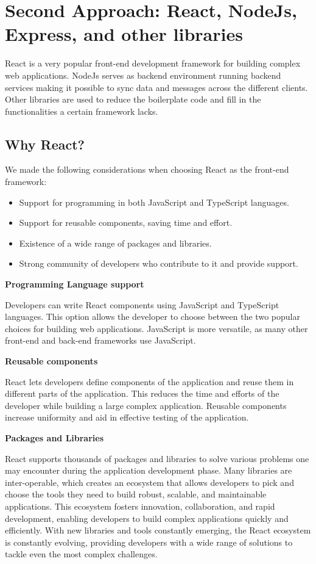 \section{Second Approach: React, NodeJs, Express, and other libraries}
\label{section:second_approach}

React is a very popular front-end development framework for building complex web applications. NodeJs\cite{nodejs} serves as backend environment running backend services making it possible to sync data and messages across the different clients. Other libraries are used to reduce the boilerplate code and fill in the functionalities a certain framework lacks.

\subsection{Why React?}
We made the following considerations when choosing React as the front-end framework:

\begin{itemize}
    \item Support for programming in both JavaScript and TypeScript languages.
    \item Support for reusable components, saving time and effort.
    \item Existence of a wide range of packages and libraries.
    \item Strong community of developers who contribute to it and provide support.
\end{itemize}

\textbf{Programming Language support}

Developers can write React components using JavaScript and TypeScript languages. This option allows the developer to choose between the two popular choices for building web applications. JavaScript is more versatile, as many other front-end and back-end frameworks use JavaScript. 

\textbf{Reusable components}

React lets developers define components of the application and reuse them in different parts of the application. This reduces the time and efforts of the developer while building a large complex application. Reusable components increase uniformity and aid in effective testing of the application.

\textbf{Packages and Libraries}

React supports thousands of packages and libraries to solve various problems one may encounter during the application development phase. Many libraries are inter-operable, which creates an ecosystem that allows developers to pick and choose the tools they need to build robust, scalable, and maintainable applications. This ecosystem fosters innovation, collaboration, and rapid development, enabling developers to build complex applications quickly and efficiently. With new libraries and tools constantly emerging, the React ecosystem is constantly evolving, providing developers with a wide range of solutions to tackle even the most complex challenges.

